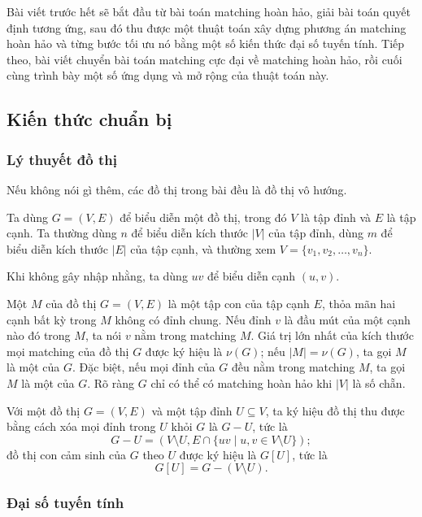 \documentclass[11pt]{article}
\begin{document}
Bài viết trước hết sẽ bắt đầu từ bài toán matching hoàn hảo, giải bài toán
quyết định tương ứng, sau đó thu được một thuật toán xây dựng phương án
matching hoàn hảo và từng bước tối ưu nó bằng một số kiến thức đại số tuyến
tính. Tiếp theo, bài viết chuyển bài toán matching cực đại về matching hoàn
hảo, rồi cuối cùng trình bày một số ứng dụng và mở rộng của thuật toán này.

\subsection{Kiến thức chuẩn bị}

\subsubsection{Lý thuyết đồ thị}

Nếu không nói gì thêm, các đồ thị trong bài đều là đồ thị vô hướng.

Ta dùng \(G=(V,E)\) để biểu diễn một đồ thị, trong đó \(V\) là tập đỉnh và
\(E\) là tập cạnh. Ta thường dùng \(n\) để biểu diễn kích thước \(|V|\) của
tập đỉnh, dùng \(m\) để biểu diễn kích thước \(|E|\) của tập cạnh, và thường
xem \(V=\{v_1,v_2,\ldots,v_n\}\).

Khi không gây nhập nhằng, ta dùng \(uv\) để biểu diễn cạnh \((u,v)\).

Một  \(M\) của đồ thị \(G=(V,E)\) là một tập con của tập cạnh
\(E\), thỏa mãn hai cạnh bất kỳ trong \(M\) không có đỉnh chung. Nếu đỉnh \(v\)
là đầu mút của một cạnh nào đó trong \(M\), ta nói \(v\) nằm trong matching
\(M\). Giá trị lớn nhất của kích thước mọi matching của đồ thị \(G\) được ký
hiệu là \(\nu(G)\); nếu \(|M|=\nu(G)\), ta gọi \(M\) là một  của \(G\). Đặc biệt, nếu mọi đỉnh của \(G\) đều nằm trong matching \(M\),
ta gọi \(M\) là một  của \(G\). Rõ ràng \(G\) chỉ có
thể có matching hoàn hảo khi \(|V|\) là số chẵn.

Với một đồ thị \(G=(V,E)\) và một tập đỉnh \(U\subseteq V\), ta ký hiệu đồ thị
thu được bằng cách xóa mọi đỉnh trong \(U\) khỏi \(G\) là \(G-U\), tức là
\[
  G-U=(V\setminus U, E\cap\{uv\mid u,v\in V\setminus U\});
\]
đồ thị con cảm sinh của \(G\) theo \(U\) được ký hiệu là \(G[U]\), tức là
\[
  G[U]=G-(V\setminus U).
\]

\subsubsection{Đại số tuyến tính}
\end{document}
